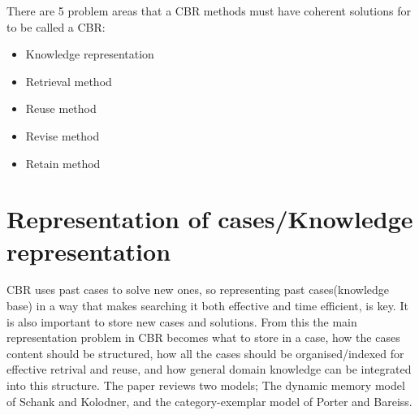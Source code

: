 \documentclass[11pt, letterpaper]{report}
\numberwithin{equation}{section}
\begin{document}
There are 5 problem areas that a CBR methods must have coherent solutions for to
be called a CBR:
\begin{itemize}
\item Knowledge representation
\item Retrieval method
\item Reuse method
\item Revise method
\item Retain method
\end{itemize}

\section{Representation of cases/Knowledge representation}
CBR uses past cases to solve new ones, so representing past cases(knowledge
base) in a way that makes searching it both effective and time efficient, is key.
It is also important to store new cases and solutions. From this the main
representation problem in CBR
becomes what to store in a case, how the cases content should be structured,
how all the cases should be organised/indexed for effective retrival and reuse,
and how general domain knowledge can be integrated into this structure. The
paper reviews two models; The dynamic memory model of Schank and Kolodner, and
the category-exemplar model of Porter and Bareiss.
\end{document}
